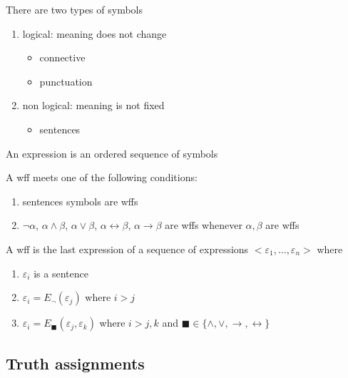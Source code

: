 \documentclass[../../main.tex]{subfiles}
\begin{document}
\begin{definition}[Symbols]
    There are two types of symbols
    \begin{enumerate}
        \item logical: meaning does not change
        \begin{itemize}
            \item connective
            \item punctuation
        \end{itemize}
        \item non logical: meaning is not fixed
        \begin{itemize}
            \item sentences
        \end{itemize}
    \end{enumerate}
\end{definition}
\begin{definition}[Expression]
    An expression is an ordered sequence of symbols
\end{definition}
\begin{definition}
    A wff meets one of the following conditions:
    \begin{enumerate}
        \item sentences symbols are wffs
        \item $\neg\alpha$, $\alpha\wedge\beta$, $\alpha\vee\beta$, $\alpha\leftrightarrow\beta$, $\alpha\rightarrow\beta$ are wffs whenever $\alpha, \beta$ are wffs
    \end{enumerate}
\end{definition}
\begin{definition}
    A wff is the last expression of a sequence of expressions $<\varepsilon_1,\dots,\varepsilon_n>$ where
    \begin{enumerate}
        \item $\varepsilon_i$ is a sentence
        \item $\varepsilon_i = E_\neg(\varepsilon_j)$ where $i>j$
        \item $\varepsilon_i = E_\blacksquare(\varepsilon_j, \varepsilon_k)$ where $i>j,k$ and $\blacksquare\in \{ \wedge, \vee, \rightarrow, \leftrightarrow \}$
    \end{enumerate}
\end{definition}


\subsection{Truth assignments}
\end{document}
